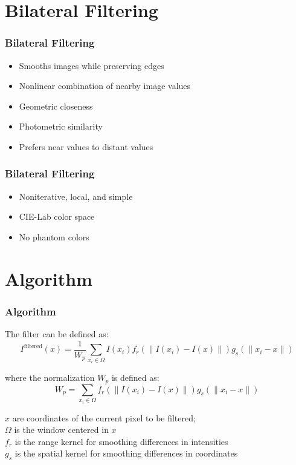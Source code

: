 \documentclass{beamer}
\begin{document}
\section{Bilateral Filtering}
\begin{frame}
\frametitle{Bilateral Filtering}
\begin{itemize}
	\item Smooths images while preserving
edges
	\pause
	\item Nonlinear combination of nearby
image values
	\pause
	\item Geometric closeness
	\pause
	\item Photometric similarity
	\pause
	\item Prefers near values to distant values

\end{itemize}
\end{frame}

\begin{frame}
\frametitle{Bilateral Filtering}
\begin{itemize}
	\item Noniterative, local, and simple
	\pause
	\item CIE-Lab color space
	\pause
	\item No phantom colors

\end{itemize}
\end{frame}

\section{Algorithm}

\begin{frame}
\frametitle{Algorithm}
The filter can be defined as:
\begin{equation} \label{eq:filter}
 I^\text{filtered}(x) = \frac{1}{W_p} \sum_{x_i \in \Omega} I(x_i)f_r(\|I(x_i)-I(x)\|)g_s(\|x_i-x\|)
\end{equation}

where the normalization $W_{p}$ is defined as:
\begin{equation} \label{eq:weight}
W_p = \sum_{x_i \in \Omega}{f_r(\|I(x_i)-I(x)\|)g_s(\|x_i-x\|)}
\end{equation}

$x$ are coordinates of the current pixel to be filtered;\\
$\Omega $  is the window centered in $x$\\
$f_{r}$ is the range kernel for smoothing differences in intensities\\
$g_{s}$ is the spatial kernel for smoothing differences in coordinates

\end{frame}
\end{document}
